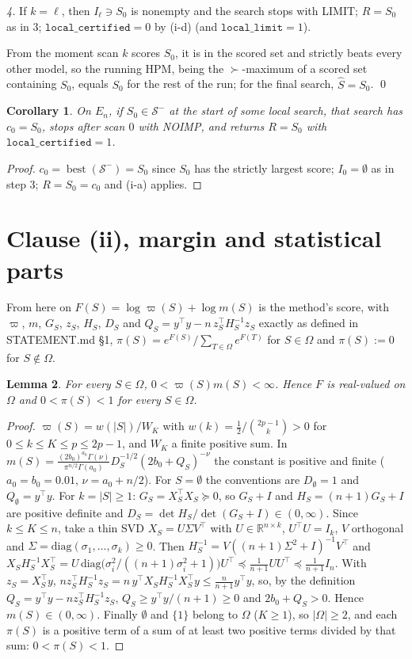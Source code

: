 \documentclass[11pt]{article}
\newtheorem{lemma}{Lemma}
\newtheorem{corollary}[lemma]{Corollary}
\theoremstyle{remark}
\newcommand{\cS}{\mathcal{S}}
\newcommand{\best}{\operatorname{best}}
\newcommand{\NOIMP}{\textsf{NOIMP}}
\newcommand{\LIMIT}{\textsf{LIMIT}}
\newcommand{\cert}{\texttt{local\_certified}}
\newcommand{\llim}{\texttt{local\_limit}}
\begin{document}
\emph{4.} If $k=\ell$, then $I_\ell\ni S_0$ is nonempty and the search stops with \LIMIT; $R=S_0$ as in 3; $\cert=0$ by (i-d) (and $\llim=1$).

From the moment scan $k$ scores $S_0$, it is in the scored set and strictly beats every other model, so the running HPM, being the $\succ$-maximum of a scored set containing $S_0$, equals $S_0$ for the rest of the run; for the final search, $\hat S=S_0$. \qed

\begin{corollary}\label{cor:already}
On $E_n$, if $S_0\in\cS^-$ at the start of some local search, that search has $c_0=S_0$, stops after scan $0$ with \NOIMP, and returns $R=S_0$ with $\cert=1$.
\end{corollary}
\begin{proof}
$c_0=\best(\cS^-)=S_0$ since $S_0$ has the strictly largest score; $I_0=\emptyset$ as in step 3; $R=S_0=c_0$ and (i-a) applies.
\end{proof}

\section{Clause (ii), margin and statistical parts}

From here on $F(S)=\log\varpi(S)+\log m(S)$ is the method's score, with $\varpi$, $m$, $G_S$, $z_S$, $H_S$, $D_S$ and $Q_S=y^\top y-n\,z_S^\top H_S^{-1}z_S$ exactly as defined in STATEMENT.md \S1, $\pi(S)=e^{F(S)}/\sum_{T\in\Omega}e^{F(T)}$ for $S\in\Omega$ and $\pi(S):=0$ for $S\notin\Omega$.

\begin{lemma}\label{lem:finite}
For every $S\in\Omega$, $0<\varpi(S)m(S)<\infty$. Hence $F$ is real-valued on $\Omega$ and $0<\pi(S)<1$ for every $S\in\Omega$.
\end{lemma}
\begin{proof}
$\varpi(S)=w(|S|)/W_K$ with $w(k)=\tfrac12/\binom{2p-1}{k}>0$ for $0\le k\le K\le p\le 2p-1$, and $W_K$ a finite positive sum. In $m(S)=\frac{(2b_0)^{a_0}\Gamma(\nu)}{\pi^{n/2}\Gamma(a_0)}D_S^{-1/2}(2b_0+Q_S)^{-\nu}$ the constant is positive and finite ($a_0=b_0=0.01$, $\nu=a_0+n/2$). For $S=\emptyset$ the conventions are $D_\emptyset=1$ and $Q_\emptyset=y^\top y$. For $k=|S|\ge1$: $G_S=X_S^\top X_S\succeq0$, so $G_S+I$ and $H_S=(n+1)G_S+I$ are positive definite and $D_S=\det H_S/\det(G_S+I)\in(0,\infty)$. Since $k\le K\le n$, take a thin SVD $X_S=U\Sigma V^\top$ with $U\in\mathbb{R}^{n\times k}$, $U^\top U=I_k$, $V$ orthogonal and $\Sigma=\mathrm{diag}(\sigma_1,\dots,\sigma_k)\ge0$. Then $H_S^{-1}=V((n+1)\Sigma^2+I)^{-1}V^\top$ and
$X_SH_S^{-1}X_S^\top=U\,\mathrm{diag}\big(\sigma_i^2/((n+1)\sigma_i^2+1)\big)U^\top\preceq\tfrac1{n+1}UU^\top\preceq\tfrac1{n+1}I_n$.
With $z_S=X_S^\top y$, $n z_S^\top H_S^{-1}z_S=n\,y^\top X_SH_S^{-1}X_S^\top y\le\frac{n}{n+1}y^\top y$, so, by the definition $Q_S=y^\top y-n z_S^\top H_S^{-1}z_S$, $Q_S\ge y^\top y/(n+1)\ge0$ and $2b_0+Q_S>0$. Hence $m(S)\in(0,\infty)$. Finally $\emptyset$ and $\{1\}$ belong to $\Omega$ ($K\ge1$), so $|\Omega|\ge2$, and each $\pi(S)$ is a positive term of a sum of at least two positive terms divided by that sum: $0<\pi(S)<1$.
\end{proof}
\end{document}
